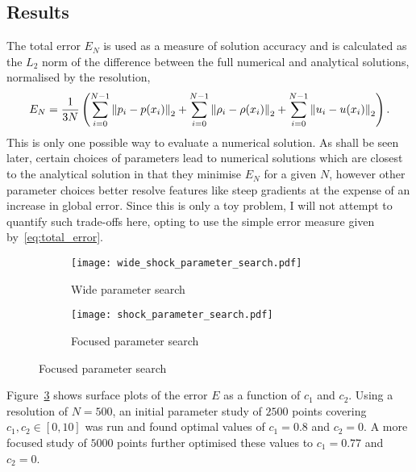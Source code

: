 \subsection{Results}

The total error $E_N$ is used as a measure of solution accuracy and is calculated as the $L_2$ norm of the difference between the full numerical and analytical solutions, normalised by the resolution,
\begin{equation}
  \label{eq:total_error}
E_N = \frac{1}{3N} \left(
\sum_{i=0}^{N-1} \left\lVert p_i - p(x_i)\right\rVert_2
+ \sum_{i=0}^{N-1} \left\lVert\rho_i - \rho(x_i)\right\rVert_2
+ \sum_{i=0}^{N-1} \left\lVert u_i - u(x_i)\right\rVert_2 \right).
\end{equation}
This is only one possible way to evaluate a numerical solution. As shall be seen later, certain choices of parameters lead to numerical solutions which are closest to the analytical solution in that they minimise $E_N$ for a given $N$, however other parameter choices better resolve features like steep gradients at the expense of an increase in global error. Since this is only a toy problem, I will not attempt to quantify such trade-offs here, opting to use the simple error measure given by~\eqref{eq:total_error}.

\begin{figure}[t]
    \hfill
    \begin{subfigure}{0.49\textwidth}
      \centering
      \texttt{[image: wide\_shock\_parameter\_search.pdf]}
      \caption{Wide parameter search}%
      \label{fig:wide_shock_parameter_search}
    \end{subfigure}
    \hfill
    \begin{subfigure}{0.49\textwidth}
      \texttt{[image: shock\_parameter\_search.pdf]}
      \caption{Focused parameter search}%
      \label{fig:shock_parameter_search}
    \end{subfigure}
\label{fig:shock_parameter_searches}%
\end{figure}

Figure~\ref{fig:shock_parameter_searches} shows surface plots of the error $E$ as a function of $c_1$ and $c_2$. Using a resolution of $N=500$, an initial parameter study of $2500$ points covering $c_1, c_2 \in [0, 10]$ was run and found optimal values of $c_1 = 0.8$ and $c_2 = 0$. A more focused study of $5000$ points further optimised these values to $c_1 = 0.77$ and $c_2 = 0$.

